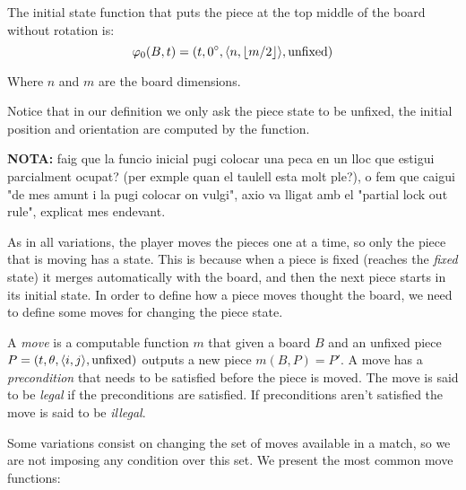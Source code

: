 \begin{example} The initial state function that puts the piece at the top middle of the board without rotation is:
$$\varphi_0(B,t) = \piece[t][0^\circ][n][\lfloor m / 2 \rfloor][\text{unfixed}]$$

Where $n$ and $m$ are the board dimensions.

\end{example}


Notice that in our definition we only ask the piece state to be unfixed, the initial position and orientation are computed by the function. 

\vspace{10px}
\textbf{NOTA:} faig que la funcio inicial pugi colocar una peca en un lloc que estigui parcialment ocupat? (per exmple quan el taulell esta molt ple?), o fem que caigui "de mes amunt i la pugi colocar on vulgi", axio va lligat amb el "partial lock out rule", explicat mes endevant.
\vspace{10px}

As in all variations, the player moves the pieces one at a time, so only the piece that is moving has a state. This is because when a piece is fixed (reaches the \emph{fixed} state) it merges automatically with the board, and then the next piece starts in its initial state. In order to define how a piece moves thought the board, we need to define some moves for changing the piece state. 

\begin{definition} 
  A \emph{move} is a computable function $m$ that given a board $B$ and an unfixed piece $P = \piece[t][\theta][i][j][\text{unfixed}]$ outputs a new piece $m(B, P) = P'$. A move has a \emph{precondition} that needs to be satisfied before the piece is moved. The move is said to be \emph{legal} if the preconditions are satisfied. If preconditions aren't satisfied the move is said to be \emph{illegal}.
\end{definition}

Some variations consist on changing the set of  moves available in a match, so we are not imposing any condition over this set. We present the most common move functions:

